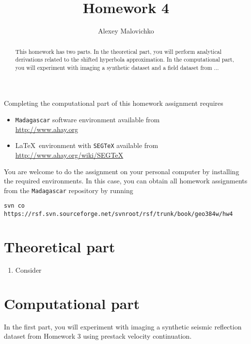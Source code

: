 \author{Alexey Malovichko} 
\title{Homework 4}

\begin{abstract}
  This homework has two parts. In the theoretical part, you will
  perform analytical derivations related to the shifted hyperbola
  approximation. In the computational part, you will experiment with
  imaging a synthetic dataset and a field dataset from ...
\end{abstract}

Completing the computational part of this homework assignment requires
\begin{itemize}
\item \texttt{Madagascar} software environment available from \\
  \url{http://www.ahay.org}
\item \LaTeX\ environment with \texttt{SEGTeX} available from \\ 
  \url{http://www.ahay.org/wiki/SEGTeX}
\end{itemize}

You are welcome to do the assignment on your personal computer by
installing the required environments. In this case, you can obtain all
homework assignments from the \texttt{Madagascar} repository by running
\begin{verbatim}
svn co https://rsf.svn.sourceforge.net/svnroot/rsf/trunk/book/geo384w/hw4 
\end{verbatim}

\section{Theoretical part}

\begin{enumerate}
\item Consider 
\end{enumerate}

\section{Computational part}

\item In the first part, you will experiment with 
  imaging a synthetic seismic reflection dataset from Homework 3 using
  prestack velocity continuation.



